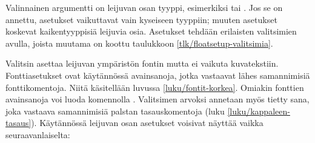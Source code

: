 
Valinnainen argumentti  on leijuvan osan tyyppi,
esimerkiksi  tai . Jos se on annettu,
asetukset vaikuttavat vain kyseiseen tyyppiin; muuten asetukset koskevat
kaikentyyppisiä leijuvia osia. Asetukset tehdään erilaisten valitsimien
avulla, joista muutama on koottu taulukkoon
\ref{tlk/floatsetup-valitsimia}.

Valitsin  asettaa leijuvan ympäristön fontin mutta ei
vaikuta kuvatekstiin. Fonttiasetukset ovat käytännössä avainsanoja,
jotka vastaavat lähes samannimisiä fonttikomentoja. Niitä käsitellään
luvussa \ref{luku/fontit-korkea}. Omiakin fonttien avainsanoja voi luoda
komennolla . Valitsimen 
arvoksi annetaan myös tietty sana, joka vastaava samannimisiä palstan
tasauskomentoja (luku \ref{luku/kappaleen-tasaus}). Käytännössä leijuvan
osan asetukset voisivat näyttää vaikka seuraavanlaiselta:


